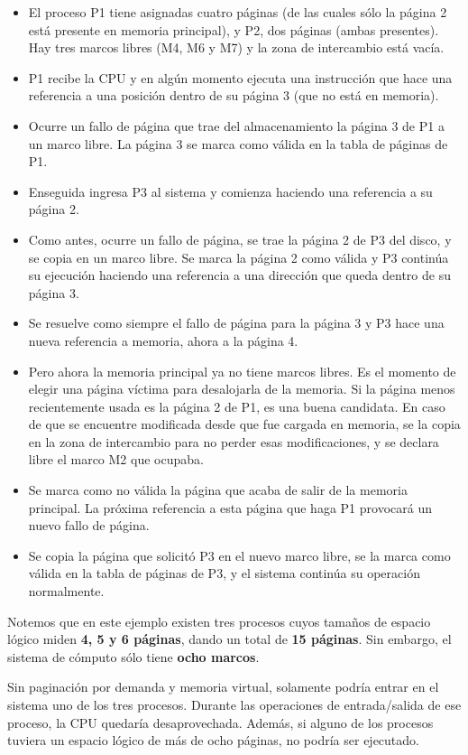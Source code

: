 \documentclass[spanish,A4,]{article}
\begin{document}
\begin{itemize}
\item
  El proceso P1 tiene asignadas cuatro páginas (de las cuales sólo la
  página 2 está presente en memoria principal), y P2, dos páginas (ambas
  presentes). Hay tres marcos libres (M4, M6 y M7) y la zona de
  intercambio está vacía.
\item
  P1 recibe la CPU y en algún momento ejecuta una instrucción que hace
  una referencia a una posición dentro de su página 3 (que no está en
  memoria).
\item
  Ocurre un fallo de página que trae del almacenamiento la página 3 de
  P1 a un marco libre. La página 3 se marca como válida en la tabla de
  páginas de P1.
\item
  Enseguida ingresa P3 al sistema y comienza haciendo una referencia a
  su página 2.
\item
  Como antes, ocurre un fallo de página, se trae la página 2 de P3 del
  disco, y se copia en un marco libre. Se marca la página 2 como válida
  y P3 continúa su ejecución haciendo una referencia a una dirección que
  queda dentro de su página 3.
\item
  Se resuelve como siempre el fallo de página para la página 3 y P3 hace
  una nueva referencia a memoria, ahora a la página 4.
\item
  Pero ahora la memoria principal ya no tiene marcos libres. Es el
  momento de elegir una página víctima para desalojarla de la memoria.
  Si la página menos recientemente usada es la página 2 de P1, es una
  buena candidata. En caso de que se encuentre modificada desde que fue
  cargada en memoria, se la copia en la zona de intercambio para no
  perder esas modificaciones, y se declara libre el marco M2 que
  ocupaba.
\item
  Se marca como no válida la página que acaba de salir de la memoria
  principal. La próxima referencia a esta página que haga P1 provocará
  un nuevo fallo de página.
\item
  Se copia la página que solicitó P3 en el nuevo marco libre, se la
  marca como válida en la tabla de páginas de P3, y el sistema continúa
  su operación normalmente.
\end{itemize}

Notemos que en este ejemplo existen tres procesos cuyos tamaños de
espacio lógico miden \textbf{4, 5 y 6 páginas}, dando un total de
\textbf{15 páginas}. Sin embargo, el sistema de cómputo sólo tiene
\textbf{ocho marcos}.

Sin paginación por demanda y memoria virtual, solamente podría entrar en
el sistema uno de los tres procesos. Durante las operaciones de
entrada/salida de ese proceso, la CPU quedaría desaprovechada. Además,
si alguno de los procesos tuviera un espacio lógico de más de ocho
páginas, no podría ser ejecutado.
\end{document}
